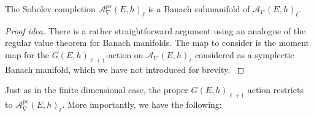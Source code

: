 \documentclass[12pt]{ociamthesis}  %
\begin{document}
\begin{lemma}
  The Sobolev completion $\mathcal A^{ps}_\nabla(E,h)_\ell$ is a
  Banach submanifold of $\mathcal A_\nabla(E,h)_\ell$.
  \begin{proof}[Proof idea]
    There is a rather straightforward argument using an analogue
    of the regular value theorem for Banach manifolds. The map
    to consider is the moment map for the $G(E,h)_{\ell+1}$-action
    on $\mathcal A_\nabla(E,h)_\ell$ considered as a symplectic
    Banach manifold, which we have not introduced for brevity.
    \cite[Proposition 5.8]{neitzke2021}
  \end{proof}
\end{lemma}
Just as in the finite dimensional case, the proper $G(E,h)_{\ell+1}$
action restricts to $\mathcal A^{ps}_\nabla(E,h)_\ell$.
More importantly, we have the following:
\end{document}
